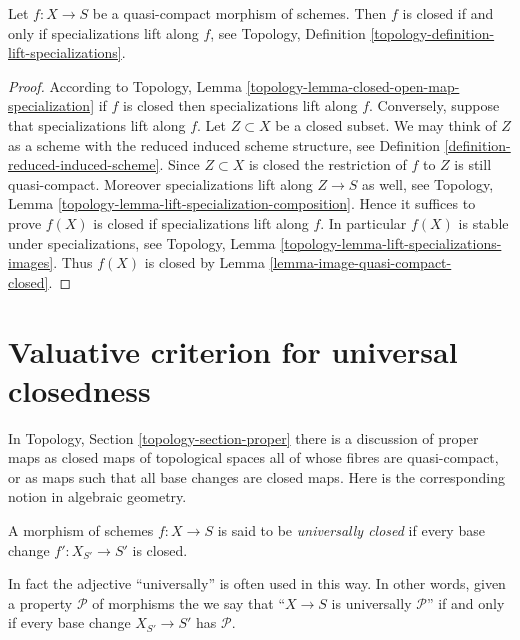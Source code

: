 \begin{lemma}
\label{lemma-quasi-compact-closed}
Let $f : X \to S$ be a quasi-compact morphism of schemes.
Then $f$ is closed if and only if specializations lift
along $f$, see
Topology, Definition \ref{topology-definition-lift-specializations}.
\end{lemma}

\begin{proof}
According to
Topology, Lemma \ref{topology-lemma-closed-open-map-specialization}
if $f$ is closed then specializations lift along $f$.
Conversely, suppose that specializations lift along $f$.
Let $Z \subset X$ be a closed subset. We may think of $Z$
as a scheme with the reduced induced scheme structure, see
Definition \ref{definition-reduced-induced-scheme}.
Since $Z \subset X$ is closed the restriction
of $f$ to $Z$ is still quasi-compact. Moreover specializations lift
along $Z \to S$ as well,
see Topology, Lemma \ref{topology-lemma-lift-specialization-composition}.
Hence it suffices to prove $f(X)$ is closed if specializations lift along $f$.
In particular $f(X)$ is stable under specializations, see
Topology, Lemma \ref{topology-lemma-lift-specializations-images}.
Thus $f(X)$ is closed by
Lemma \ref{lemma-image-quasi-compact-closed}.
\end{proof}










\section{Valuative criterion for universal closedness}
\label{section-valuative-criterion-universal-closedness}

\noindent
In Topology, Section \ref{topology-section-proper} there is a
discussion of proper maps as closed maps of topological spaces
all of whose fibres are quasi-compact, or as maps such that
all base changes are closed maps. Here is the corresponding notion
in algebraic geometry.

\begin{definition}
\label{definition-universally-closed}
A morphism of schemes $f : X \to S$ is said to be
{\it universally closed} if every base change
$f' : X_{S'} \to S'$ is closed.
\end{definition}

\noindent
In fact the adjective ``universally'' is often used in this way.
In other words, given a property $\mathcal{P}$ of morphisms
the we say that ``$X \to S$ is universally $\mathcal{P}$''
if and only if every base change $X_{S'} \to S'$ has $\mathcal{P}$.

